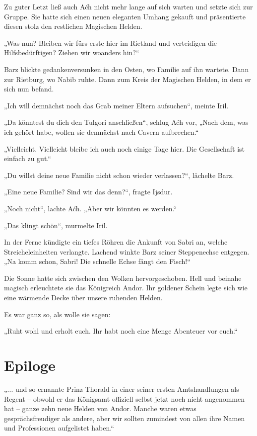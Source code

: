 Zu guter Letzt ließ auch Aćh nicht mehr lange auf sich warten und setzte sich zur Gruppe. Sie hatte sich einen neuen eleganten Umhang gekauft und präsentierte diesen stolz den restlichen Magischen Helden.

„Was nun? Bleiben wir fürs erste hier im Rietland und verteidigen die Hilfsbedürftigen? Ziehen wir woanders hin?“

Barz blickte gedankenversunken in den Osten, wo Familie auf ihn wartete. Dann zur Rietburg, wo Nabib ruhte. Dann zum Kreis der Magischen Helden, in dem er sich nun befand.

„Ich will demnächst noch das Grab meiner Eltern aufsuchen“, meinte Iril.

„Da könntest du dich den Tulgori anschließen“, schlug Aćh vor, „Nach dem, was ich gehört habe, wollen sie demnächst nach Cavern aufbrechen.“

„Vielleicht. Vielleicht bleibe ich auch noch einige Tage hier. Die Gesellschaft ist einfach zu gut.“

„Du willst deine neue Familie nicht schon wieder verlassen?“, lächelte Barz.

„Eine neue Familie? Sind wir das denn?“, fragte Ijsdur.

„Noch nicht“, lachte Aćh. „Aber wir könnten es werden.“

„Das klingt schön“, murmelte Iril.

In der Ferne kündigte ein tiefes Röhren die Ankunft von Sabri an, welche Streicheleinheiten verlangte. Lachend winkte Barz seiner Steppenechse entgegen. „Na komm schon, Sabri! Die schnelle Echse fängt den Fisch!“

Die Sonne hatte sich zwischen den Wolken hervorgeschoben. Hell und beinahe magisch erleuchtete sie das Königreich Andor. Ihr goldener Schein legte sich wie eine wärmende Decke über unsere ruhenden Helden.

Es war ganz so, als wolle sie sagen:

„Ruht wohl und erholt euch. Ihr habt noch eine Menge Abenteuer vor euch.“








\newpage
\section{Epiloge}


„... und so ernannte Prinz Thorald in einer seiner ersten Amtshandlungen als Regent – obwohl er das Königsamt offiziell selbst jetzt noch nicht angenommen hat – ganze zehn neue Helden von Andor. Manche waren etwas gesprächsfreudiger als andere, aber wir sollten zumindest von allen ihre Namen und Professionen aufgelistet haben.“

